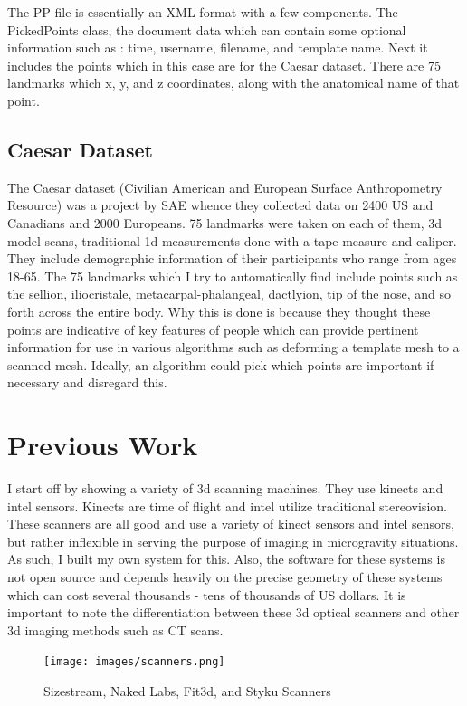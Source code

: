 The PP file is essentially an XML format with a few components. The PickedPoints class, the document data which can contain some optional information such as : time, username, filename, and template name. Next it includes the points which in this case are for the Caesar dataset. There are 75 landmarks which x, y, and z coordinates, along with the anatomical name of that point.

\section{Caesar Dataset}
The Caesar dataset (Civilian American and European Surface Anthropometry Resource) was a project by SAE whence they collected data on 2400 US and Canadians and 2000 Europeans. 75 landmarks were taken on each of them, 3d model scans, traditional 1d measurements done with a tape measure and caliper. They include demographic information of their participants who range from ages 18-65. The 75 landmarks which I try to automatically find include points such as the sellion, iliocristale, metacarpal-phalangeal, dactlyion, tip of the nose, and so forth across the entire body. Why this is done is because they thought these points are indicative of key features of people which can provide pertinent information for use in various algorithms such as deforming a template mesh to a scanned mesh. Ideally, an algorithm could pick which points are important if necessary and disregard this.

\chapter{Previous Work}
I start off by showing a variety of 3d scanning machines. They use kinects and intel sensors. Kinects are time of flight and intel utilize traditional stereovision.
These scanners are all good and use a variety of kinect sensors and intel sensors, but rather inflexible in serving the purpose of imaging in microgravity situations. As such, I built my own system for this. Also, the software for these systems is not open source and depends heavily on the precise geometry of these systems which can cost several thousands - tens of thousands of US dollars. It is important to note the differentiation between these 3d optical scanners and other 3d imaging methods such as CT scans.

\begin{figure}[!htb]
	\caption{Sizestream, Naked Labs, Fit3d, and Styku Scanners}
	\centering
	\texttt{[image: images/scanners.png]}
\end{figure}

